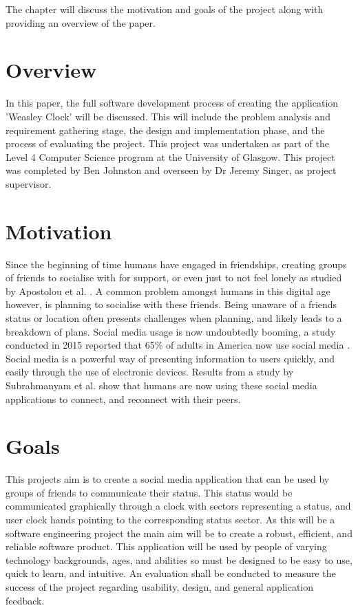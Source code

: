 The chapter will discuss the motivation and goals of the project along with providing an overview of the paper.

\section{Overview}

In this paper, the full software development process of creating the application 'Weasley Clock' will be discussed. This will include the problem analysis and requirement gathering stage, the design and implementation phase, and the process of evaluating the project. This project was undertaken as part of the Level 4 Computer Science program at the University of Glasgow. This project was completed by Ben Johnston and overseen by Dr Jeremy Singer, as project supervisor.

\section{Motivation}
Since the beginning of time humans have engaged in friendships, creating groups of friends to socialise with for support, or even just to not feel lonely as studied by Apostolou et al. \cite{whyFriends}. A common problem amongst humans in this digital age however, is planning to socialise with these friends. Being unaware of a friends status or location often presents challenges when planning, and likely leads to a breakdown of plans.  \newline\newline
Social media usage is now undoubtedly booming, a study conducted in 2015 reported that 65\% of adults in America now use social media \cite{socialMediaUsage}. Social media is a powerful way of presenting information to users quickly, and easily through the use of electronic devices. Results from a study by Subrahmanyam et al. \cite{SUBRAHMANYAM2008420} show that humans are now using these social media applications to connect, and reconnect with their peers.


\section{Goals}
This projects aim is to create a social media application that can be used by groups of friends to communicate their status. This status would be communicated graphically through a clock with sectors representing a status, and user clock hands pointing to the corresponding status sector. As this will be a software engineering project the main aim will be to create a robust, efficient, and reliable software product. This application will be used by people of varying technology backgrounds, ages, and abilities so must be designed to be easy to use, quick to learn, and intuitive. An evaluation shall be conducted to measure the success of the project regarding usability, design, and general application feedback.

